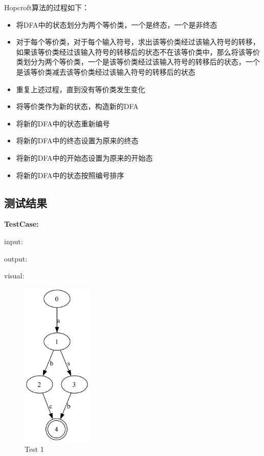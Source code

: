 \documentclass{hdureport}
\begin{document}
Hopcroft算法的过程如下：

\begin{itemize}
    \item{将DFA中的状态划分为两个等价类，一个是终态，一个是非终态}
    \item{对于每个等价类，对于每个输入符号，求出该等价类经过该输入符号的转移，如果该等价类经过该输入符号的转移后的状态不在该等价类中，那么将该等价类划分为两个等价类，一个是该等价类经过该输入符号的转移后的状态，一个是该等价类减去该等价类经过该输入符号的转移后的状态}
    \item{重复上述过程，直到没有等价类发生变化}
    \item {将等价类作为新的状态，构造新的DFA}
    \item {将新的DFA中的状态重新编号}
    \item {将新的DFA中的终态设置为原来的终态}
    \item {将新的DFA中的开始态设置为原来的开始态}
    \item {将新的DFA中的状态按照编号排序}
\end{itemize}

\newpage

\subsection{测试结果}

\noindent\textbf{TestCase:} 

\noindent\textsf{input:}

\noindent\textsf{output:}

\noindent\textsf{visual:}
\begin{figure}[H]
    \centering
    \includegraphics[width=0.3\textwidth]{dfa_test/1.png}
    \caption{Test 1}
\end{figure}
\end{document}
